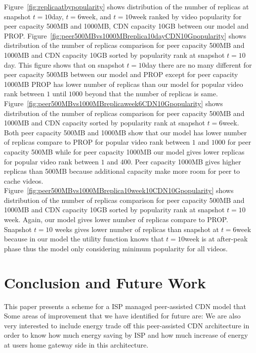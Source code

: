 \documentclass[10pt,final,journal,a4paper]{IEEEtran}
\begin{document}
Figure~\ref{fig:replicaatbypopularity} shows distribution of the number of replicas at snapshot $t=10$day, $t=6$week, and $t=10$week ranked by video popularity for peer capacity 500MB and 1000MB, CDN capacity 10GB between our model and PROP.
Figure~\ref{fig:peer500MBvs1000MBreplica10dayCDN10Gpopularity} shows distribution of the number of replicas comparison for peer capacity 500MB and 1000MB and CDN capacity 10GB sorted by popularity rank at snapshot $t=10$day.
This figure shows that on snapshot $t=10$day there are no many different for peer capacity 500MB between our model and PROP except for peer capacity 1000MB PROP has lower number of replicas than our model for popular video rank between $1$ until $1000$ beyond that the number of replicas is same.
Figure~\ref{fig:peer500MBvs1000MBreplicaweek6CDN10Gpopularity} shows distribution of the number of replicas comparison for peer capacity 500MB and 1000MB and CDN capacity sorted by popularity rank at snapshot $t=6$week.
Both peer capacity 500MB and 1000MB show that our model has lower number of replicas compare to PROP for popular video rank between $1$ and $1000$ for peer capacity 500MB while for peer capacity 1000MB our model gives lower replicas for popular video rank between $1$ and $400$.  
Peer capacity 1000MB gives higher replicas than 500MB because additional capacity make more room for peer to cache videos.
Figure~\ref{fig:peer500MBvs1000MBreplica10week10CDN10Gpopularity} shows distribution of the number of replicas comparison for peer capacity 500MB and 1000MB and CDN capacity 10GB sorted by popularity rank at snapshot $t=10$week.
Again, our model gives lower number of replicas compare to PROP. 
Snapshot $t=10$ weeks gives lower number of replicas than snapshot at $t=6$week because in our model the utility function knows that $t=10$week is at after-peak phase thus the model only considering minimum popularity for all videos. 





\section{Conclusion and Future Work}\label{conclusion}
This paper presents a scheme for a ISP managed peer-assisted CDN model that 
Some areas of improvement that we have identified for future are:
We are also very interested to include energy trade off this peer-assisted CDN architecture in order to know how much energy saving by ISP and how much increase of energy at users home gateway side in this architecture.
\end{document}
